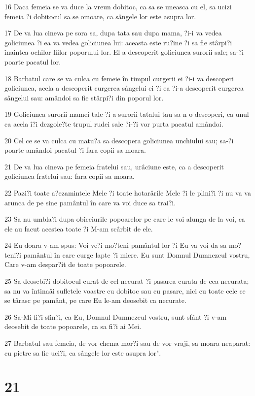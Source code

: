 \par 16 Daca femeia se va duce la vreun dobitoc, ca sa se uneasca cu el, sa ucizi femeia ?i dobitocul sa se omoare, ca sângele lor este asupra lor.
\par 17 De va lua cineva pe sora sa, dupa tata sau dupa mama, ?i-i va vedea goliciunea ?i ea va vedea goliciunea lui: aceasta este ru?ine ?i sa fie stârpi?i înaintea ochilor fiilor poporului lor. El a descoperit goliciunea surorii sale; sa-?i poarte pacatul lor.
\par 18 Barbatul care se va culca cu femeie în timpul curgerii ei ?i-i va descoperi goliciunea, acela a descoperit curgerea sângelui ei ?i ea ?i-a descoperit curgerea sângelui sau: amândoi sa fie stârpi?i din poporul lor.
\par 19 Goliciunea surorii mamei tale ?i a surorii tatalui tau sa n-o descoperi, ca unul ca acela î?i dezgole?te trupul rudei sale ?i-?i vor purta pacatul amândoi.
\par 20 Cel ce se va culca cu matu?a sa descopera goliciunea unchiului sau; sa-?i poarte amândoi pacatul ?i fara copii sa moara.
\par 21 De va lua cineva pe femeia fratelui sau, urâciune este, ca a descoperit goliciunea fratelui sau: fara copii sa moara.
\par 22 Pazi?i toate a?ezamintele Mele ?i toate hotarârile Mele ?i le plini?i ?i nu va va arunca de pe sine pamântul în care va voi duce sa trai?i.
\par 23 Sa nu umbla?i dupa obiceiurile popoarelor pe care le voi alunga de la voi, ca ele au facut acestea toate ?i M-am scârbit de ele.
\par 24 Eu doara v-am spus: Voi ve?i mo?teni pamântul lor ?i Eu va voi da sa mo?teni?i pamântul în care curge lapte ?i miere. Eu sunt Domnul Dumnezeul vostru, Care v-am despar?it de toate popoarele.
\par 25 Sa deosebi?i dobitocul curat de cel necurat ?i pasarea curata de cea necurata; sa nu va întinaâi sufletele voastre cu dobitoc sau cu pasare, nici cu toate cele ce se târasc pe pamânt, pe care Eu le-am deosebit ca necurate.
\par 26 Sa-Mi fi?i sfin?i, ca Eu, Domnul Dumnezeul vostru, sunt sfânt ?i v-am deosebit de toate popoarele, ca sa fi?i ai Mei.
\par 27 Barbatul sau femeia, de vor chema mor?i sau de vor vraji, sa moara neaparat: cu pietre sa fie uci?i, ca sângele lor este asupra lor".

\chapter{21}

